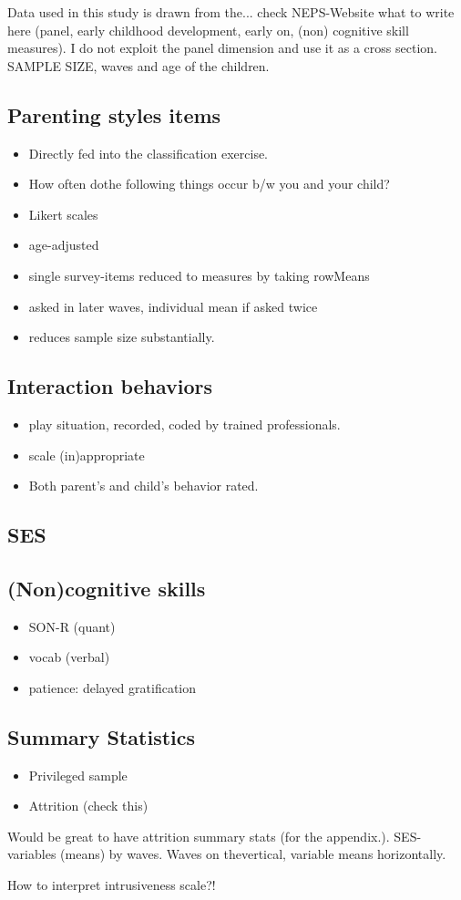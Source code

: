 Data used in this study is drawn from the... check NEPS-Website what to write here (panel, early childhood development, early on, (non) cognitive skill measures). I do not exploit the panel dimension and use it as a cross section. SAMPLE SIZE, waves and age of the children.


\subsection{Parenting styles items}
\begin{itemize}
	\item Directly fed into the classification exercise.
	\item How often dothe following things occur b/w you and your child?
	\item Likert scales
	\item age-adjusted
	\item single survey-items reduced to measures by taking rowMeans
	\item asked in later waves, individual mean if asked twice
	\item reduces sample size substantially.
\end{itemize}

\subsection{Interaction behaviors}
\begin{itemize}
	\item play situation, recorded, coded by trained professionals.
	\item scale (in)appropriate
	\item Both parent's and child's behavior rated.
\end{itemize}

\subsection{SES}
\subsection{(Non)cognitive skills}
\begin{itemize}
	\item SON-R (quant)
	\item vocab (verbal)
	\item patience: delayed gratification
\end{itemize}

\subsection{Summary Statistics}
\begin{itemize}
	\item Privileged sample
	\item Attrition (check this)
\end{itemize}

Would be great to have attrition summary stats (for the appendix.). SES-variables (means) by waves. Waves on thevertical, variable means horizontally.


How to interpret intrusiveness scale?!